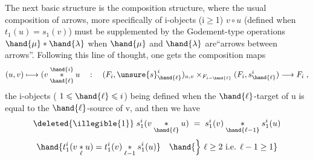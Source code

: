 The next basic structure is the composition structure,  where the usual
composition of arrows,  more specifically of i-objects (i$\geq$1)  $v \circ u$
(defined when $t_1(u)=s_1(v)$)  must be supplemented by the Godement-type
operations $\hand{\mu} * \hand{\lambda}$ when $\hand{\mu}$ and $\hand{\lambda}$ are``arrows between arrows''.  Following
this line of thought,  one gets the composition maps
\[ (u,v) \longmapsto ( v \overset{\hand{i}}{\underset{\hand{\ell}}{*}} u \quad : \quad (F_i, \unsure{s}^i_{\hand{\ell}})_{u,v} \times_{F_{i-\hand{\ell}}} (F_i, s^i_{\hand{\ell}}) \longrightarrow F_i \; , \]
the    i-objects ( $1 \leqslant \hand{\ell} \leqslant i$)  being defined when the
$\hand{\ell}$-target of u is equal to the $\hand{\ell}$-source of v,  and then we have
\[ \deleted{\illegible{1}} \; s^i_1(v \underset{\hand{\ell}}{*} u) \; = \; s^i_1(v) \underset{\hand{\ell-1}}{*} s^i_1(u) \]
\[ \hand{t^i_1(v \underset{\ell}{*} u) = t^i_1(v) \underset{\ell-1}{*} s^i_1(u)} \quad \hand{\Big\}\ \ell \geq 2 \text{ i.e. } \ell-1 \geq 1} \]

